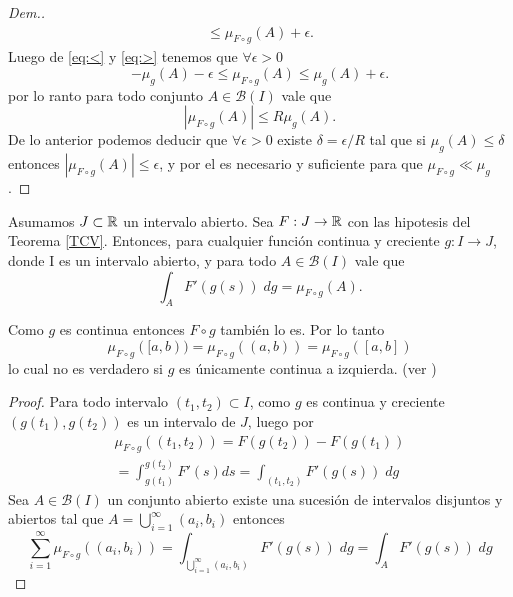 \begin{proof}[Dem.]
\begin{multline}
    \leq \mu_{F\circ g}(A)+\epsilon.\label{eq:>}
\end{multline}
Luego de \ref{eq:<} y \ref{eq:>} tenemos que $\forall \epsilon>0$
\begin{equation}
    -\mu_g(A)-\epsilon\leq \mu_{F\circ g}(A)\leq  \mu_g(A)+\epsilon.
\end{equation}
por lo ranto para todo conjunto $A\in \mathcal{B}(I)$ vale que 
$$ |\mu_{F\circ g}(A)|\leq R\mu_g(A).$$
De lo anterior podemos deducir que $\forall \epsilon>0$ existe $\delta=\epsilon/R$ tal que si $\mu_g(A)\leq \delta$ entonces $|\mu_{F\circ g}(A)|\leq \epsilon$, y por el   \cite[Teorema 3.5]{folland} es necesario y suficiente para que $\mu_{F\circ g} \ll \mu_g$.



\end{proof}

\begin{lem}\label{lem: g cont}
    Asumamos $J\subset \mathbb{R}$ un intervalo abierto. Sea $F:J\to \mathbb{R}$ con las hipotesis del Teorema \eqref{TCV}. Entonces, para cualquier función continua y creciente $g:I\to J$, donde I es un intervalo abierto, y para todo $A\in \mathcal{B}(I)$ vale que
    \begin{equation}
        \int_{A}F'(g(s)) \;dg=\mu_{F\circ g}(A).
    \end{equation}
\end{lem}
\begin{obs}
    Como $g$ es continua entonces $F\circ g$ también lo es. Por lo tanto 
    $$\mu_{F\circ g}([a,b))=\mu_{F\circ g}((a,b))=\mu_{F\circ g}([a,b])$$
    lo cual no es verdadero si $g$ es únicamente continua a izquierda. (ver  \cite[Ejemplo 4.1.1]{Carter})
\end{obs}
\begin{proof}
    Para todo intervalo $(t_1,t_2)\subset I$, como $g$ es continua y creciente $(g(t_1),g(t_2))$ es un intervalo de $J$, luego por \cite[Teorema 6.2.1]{Carter}  
    \begin{multline}
            \mu_{F\circ g}((t_1,t_2))=F(g(t_2))-F(g(t_1))\\=\int_{g(t_1)}^{g(t_2)}F'(s) ds=\int_{(t_1,t_2)}F'(g(s)) \;dg \label{eq:g continua}
    \end{multline}
Sea $A\in \mathcal{B}(I)$ un conjunto abierto existe una sucesión de intervalos disjuntos y abiertos tal que $A= \bigcup_{i=1}^{\infty}(a_i,b_i)$ entonces 
\begin{equation*}
    \sum_{i=1}^{\infty}\mu_{F\circ g}((a_i,b_i))=\int_{\bigcup_{i=1}^{\infty}(a_i,b_i)}F'(g(s)) \;dg= \int_{A} F'(g(s))\; dg
\end{equation*}

\end{proof}



